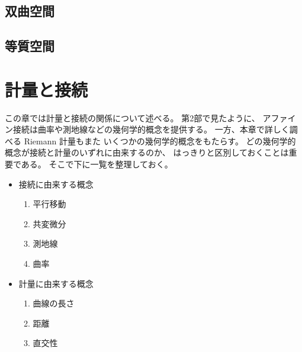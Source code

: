 \documentclass[report]{jlreq}
\begin{document}
%
\section{双曲空間}

\TODO{}

%
\section{等質空間}

\TODO{}



%
\chapter{計量と接続}

この章では計量と接続の関係について述べる。
第2部で見たように、
アファイン接続は曲率や測地線などの幾何学的概念を提供する。
一方、本章で詳しく調べる Riemann 計量もまた
いくつかの幾何学的概念をもたらす。
どの幾何学的概念が接続と計量のいずれに由来するのか、
はっきりと区別しておくことは重要である。
そこで下に一覧を整理しておく。

\begin{itemize}
    \item 接続に由来する概念
        \begin{enumerate}
            \item 平行移動
            \item 共変微分
            \item 測地線
            \item 曲率
        \end{enumerate}
    \item 計量に由来する概念
        \begin{enumerate}
            \item 曲線の長さ
            \item 距離
            \item 直交性
        \end{enumerate}
\end{itemize}

%
\end{document}
